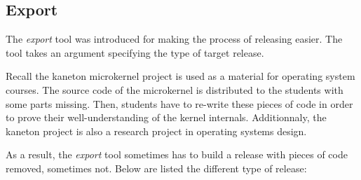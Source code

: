 %
%
%
%
%
%

%
%

\subsection{Export}

The \textit{export} tool was introduced for making the process of releasing
easier. The tool takes an argument specifying the type of target release.

Recall the kaneton microkernel project is used as a material for operating
system courses. The source code of the microkernel is distributed to
the students with some parts missing. Then, students have to re-write
these pieces of code in order to prove their well-understanding of the
kernel internals. Additionnaly, the kaneton project is also a research project
in operating systems design.

As a result, the \textit{export} tool sometimes has to build a release
with pieces of code removed, sometimes not. Below are listed the different
type of release:

